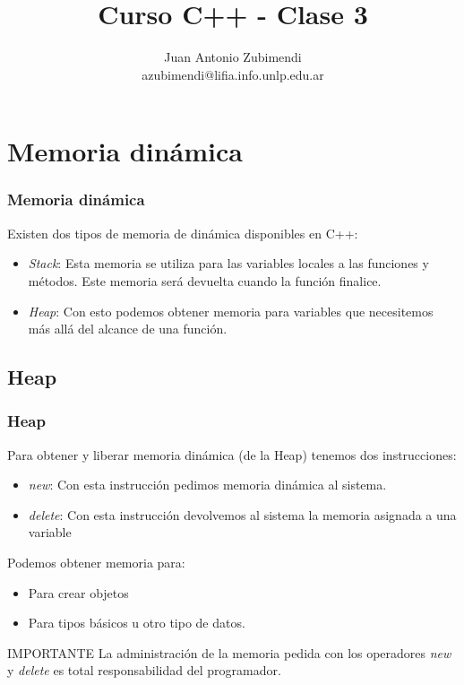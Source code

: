 \documentclass{beamer}
\title{Curso C++ - Clase 3}
\author{Juan Antonio Zubimendi\\azubimendi@lifia.info.unlp.edu.ar}
\institute{LIFIA}
\begin{document}
 

\begin{frame}
\titlepage
\end{frame}

\section{Memoria dinámica}
\begin{frame}
\frametitle{Memoria dinámica}
Existen dos tipos de memoria de dinámica disponibles en C++:
\begin{itemize}
 \item \emph{Stack}: Esta memoria se utiliza para las variables locales a las funciones y métodos. Este memoria será devuelta cuando la función finalice.
 \item \emph{Heap}: Con esto podemos obtener memoria para variables que necesitemos más allá del alcance de una función.
\end{itemize}

\end{frame}

\subsection{Heap}
\begin{frame}
\frametitle{Heap}
Para obtener y liberar memoria dinámica (de la Heap) tenemos dos instrucciones:
\begin{itemize}
 \item \emph{new}: Con esta instrucción pedimos memoria dinámica al sistema.
 \item \emph{delete}: Con esta instrucción devolvemos al sistema la memoria asignada a una variable
\end{itemize}

Podemos obtener memoria para:
\begin{itemize}
 \item Para crear objetos
 \item Para tipos básicos u otro tipo de datos.
\end{itemize}

\begin{block}{IMPORTANTE}
   La administración de la memoria pedida con los operadores \emph{new} y \emph{delete} es total responsabilidad del programador.
\end{block}

\end{frame}
\end{document}
